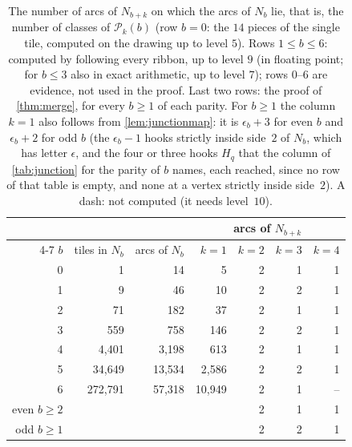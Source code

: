 \documentclass[11pt]{amsart}
\theoremstyle{definition}
\theoremstyle{remark}
\begin{document}
\begin{table}[t]
\centering\small
\caption{The number of arcs of $N_{b+k}$ on which the arcs of $N_b$ lie, that is, the number of classes of
$\mathcal P_k(b)$ (row $b=0$: the $14$ pieces of the single tile, computed on the drawing up to level $5$). Rows
$1\le b\le6$: computed by following every ribbon, up to level $9$ (in floating point; for $b\le3$ also in exact
arithmetic, up to level $7$); rows $0$--$6$ are evidence, not used in the proof. Last two rows: the proof of
\cref{thm:merge}, for every $b\ge1$ of each parity. For $b\ge1$ the column $k=1$ also follows from
\cref{lem:junctionmap}: it is $\epsilon_b+3$ for even $b$ and $\epsilon_b+2$ for odd $b$ (the $\epsilon_b-1$ hooks
strictly inside side~$2$ of $N_b$, which has letter $\epsilon$, and the four or three hooks $H_q$ that the column of \cref{tab:junction} for the
parity of $b$ names, each reached, since no row of that table is empty, and none at a vertex strictly inside side~$2$). A dash: not computed (it
needs level~$10$).}
\label{tab:merge}
\begin{tabular}{rrr@{\hspace{1.5em}}rrrr}
\toprule
& & & \multicolumn{4}{c}{arcs of $N_{b+k}$}\\
\cmidrule(l){4-7}
$b$ & tiles in $N_b$ & arcs of $N_b$ & $k=1$ & $k=2$ & $k=3$ & $k=4$\\
\midrule
0 & 1 & 14 & 5 & 2 & 1 & 1\\
1 & 9 & 46 & 10 & 2 & 2 & 1\\
2 & 71 & 182 & 37 & 2 & 1 & 1\\
3 & 559 & 758 & 146 & 2 & 2 & 1\\
4 & 4{,}401 & 3{,}198 & 613 & 2 & 1 & 1\\
5 & 34{,}649 & 13{,}534 & 2{,}586 & 2 & 2 & 1\\
6 & 272{,}791 & 57{,}318 & 10{,}949 & 2 & 1 & --\\
\midrule
even $b\ge2$ & & & & 2 & 1 & 1\\
odd $b\ge1$ & & & & 2 & 2 & 1\\
\bottomrule
\end{tabular}
\end{table}
\end{document}
